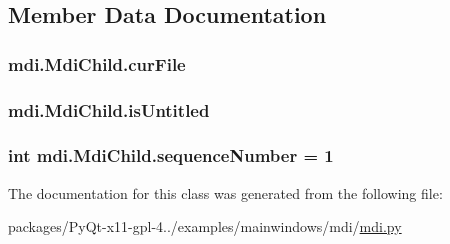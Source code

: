 \subsection{Member Data Documentation}
\hypertarget{classmdi_1_1MdiChild_ae1909c9edb7b16a42c18c6d26de81594}{}
\subsubsection[{cur\+File}]{\setlength{\rightskip}{0pt plus 5cm}mdi.\+Mdi\+Child.\+cur\+File}\label{classmdi_1_1MdiChild_ae1909c9edb7b16a42c18c6d26de81594}
\hypertarget{classmdi_1_1MdiChild_ac70eeccc0f2b96edcaf8289a9f46ff11}{}
\subsubsection[{is\+Untitled}]{\setlength{\rightskip}{0pt plus 5cm}mdi.\+Mdi\+Child.\+is\+Untitled}\label{classmdi_1_1MdiChild_ac70eeccc0f2b96edcaf8289a9f46ff11}
\hypertarget{classmdi_1_1MdiChild_a63944b83b6870ceca4854c8062b27b5f}{}
\subsubsection[{sequence\+Number}]{\setlength{\rightskip}{0pt plus 5cm}int mdi.\+Mdi\+Child.\+sequence\+Number = 1\hspace{0.3cm}{\ttfamily [static]}}\label{classmdi_1_1MdiChild_a63944b83b6870ceca4854c8062b27b5f}


The documentation for this class was generated from the following file\+:\begin{DoxyCompactItemize}
\item 
packages/\+Py\+Qt-\/x11-\/gpl-\/4../examples/mainwindows/mdi/\hyperlink{mdi_8py}{mdi.\+py}\end{DoxyCompactItemize}
